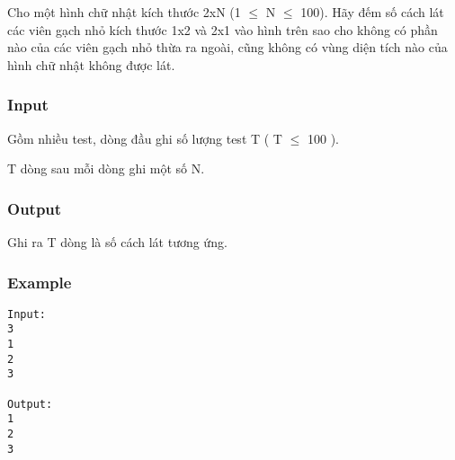 



   Cho một hình chữ nhật kích thước 2xN (1 $\le$ N $\le$ 100). Hãy đếm số cách lát các viên gạch nhỏ kích thước 1x2 và 2x1 vào hình trên sao cho không có phần nào của các viên gạch nhỏ thừa ra ngoài, cũng không có vùng diện tích nào của hình chữ nhật không được lát.  

\subsubsection{   Input  }

   Gồm nhiều test, dòng đầu ghi số lượng test T ( T $\le$ 100 ).   


   T dòng sau mỗi dòng ghi một số N.  

\subsubsection{   Output  }

   Ghi ra T dòng là số cách lát tương ứng.  

\subsubsection{   Example  }
\begin{verbatim}
Input:
3
1
2
3

Output:
1
2
3
\end{verbatim}

